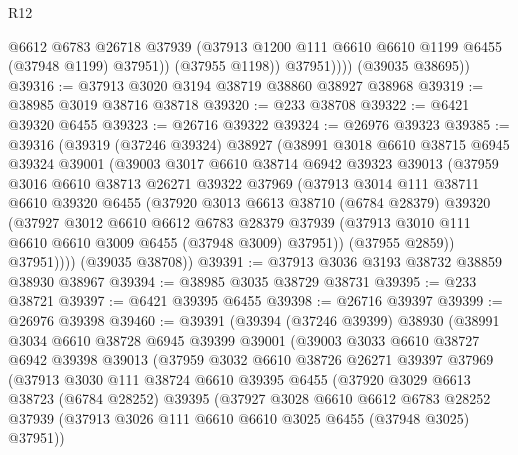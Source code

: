 \begin{lexlean}{R12}
\begin{coremodule}
                  @6612
                  @6783
                  @26718
                  @37939
                  (@37913 @1200 @111 @6610 @6610 @1199 @6455 (@37948 @1199) @37951))
                (@37955 @1198))
              @37951))))
      (@39035 @38695))
@39316 := @37913 @3020 @3194 @38719 @38860 @38927 @38968
@39319 := @38985 @3019 @38716 @38718
@39320 := @233 @38708
@39322 := @6421 @39320 @6455
@39323 := @26716 @39322
@39324 := @26976 @39323
@39385 := @39316
    (@39319
      (@37246 @39324)
      @38927
      (@38991
        @3018
        @6610
        @38715
        @6945
        @39324
        @39001
        (@39003
          @3017
          @6610
          @38714
          @6942
          @39323
          @39013
          (@37959
            @3016
            @6610
            @38713
            @26271
            @39322
            @37969
            (@37913
              @3014
              @111
              @38711
              @6610
              @39320
              @6455
              (@37920
                @3013
                @6613
                @38710
                (@6784 @28379)
                @39320
                (@37927
                  @3012
                  @6610
                  @6612
                  @6783
                  @28379
                  @37939
                  (@37913 @3010 @111 @6610 @6610 @3009 @6455 (@37948 @3009) @37951))
                (@37955 @2859))
              @37951))))
      (@39035 @38708))
@39391 := @37913 @3036 @3193 @38732 @38859 @38930 @38967
@39394 := @38985 @3035 @38729 @38731
@39395 := @233 @38721
@39397 := @6421 @39395 @6455
@39398 := @26716 @39397
@39399 := @26976 @39398
@39460 := @39391
    (@39394
      (@37246 @39399)
      @38930
      (@38991
        @3034
        @6610
        @38728
        @6945
        @39399
        @39001
        (@39003
          @3033
          @6610
          @38727
          @6942
          @39398
          @39013
          (@37959
            @3032
            @6610
            @38726
            @26271
            @39397
            @37969
            (@37913
              @3030
              @111
              @38724
              @6610
              @39395
              @6455
              (@37920
                @3029
                @6613
                @38723
                (@6784 @28252)
                @39395
                (@37927
                  @3028
                  @6610
                  @6612
                  @6783
                  @28252
                  @37939
                  (@37913 @3026 @111 @6610 @6610 @3025 @6455 (@37948 @3025) @37951))

\end{coremodule}
\end{lexlean}
